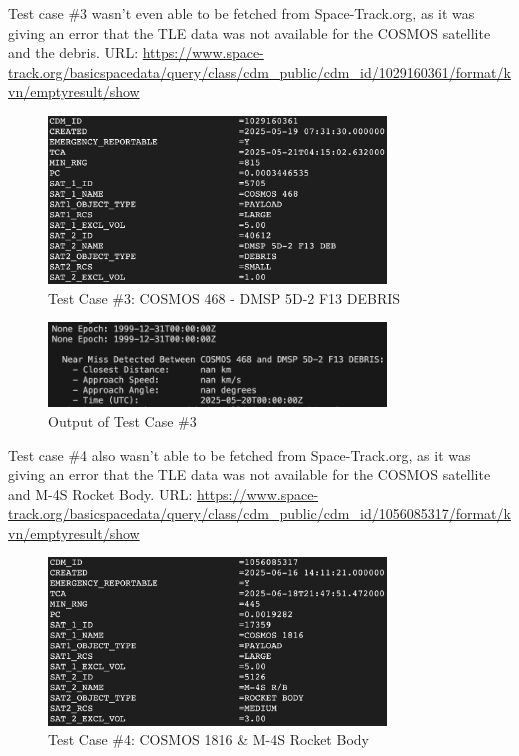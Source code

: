 \documentclass[12pt]{report}
\begin{document}
\begin{enumerate}
  Test case \#3 wasn't even able to be fetched from Space-Track.org, as it was giving an error that the TLE data was not available for the COSMOS satellite and the debris.
  \newline
  URL: \url{https://www.space-track.org/basicspacedata/query/class/cdm_public/cdm_id/1029160361/format/kvn/emptyresult/show}
  \newline
  \begin{figure}[H]
    \centering
    \includegraphics[width=0.8\textwidth]{figure_week_5_test3.png}
    \caption{Test Case \#3: COSMOS 468 - DMSP 5D-2 F13 DEBRIS}
    \label{fig:test_case_3}
  \end{figure}

  \begin{figure}[H]
    \centering
    \includegraphics[width=0.8\textwidth]{figure_week_5_test3-output.png}
    \caption{Output of Test Case \#3}
    \label{fig:test_case_3_output}
  \end{figure}

  Test case \#4 also wasn't able to be fetched from Space-Track.org, as it was giving an error that the TLE data was not available for the COSMOS satellite and M-4S Rocket Body.
  \newline
  URL: \url{https://www.space-track.org/basicspacedata/query/class/cdm_public/cdm_id/1056085317/format/kvn/emptyresult/show}
  \newline
  \begin{figure}[H]
    \centering
    \includegraphics[width=0.8\textwidth]{figure_week_5_test4.png}
    \caption{Test Case \#4: COSMOS 1816 \& M-4S Rocket Body}
    \label{fig:test_case_4}
  \end{figure}


\end{enumerate}
\end{document}
